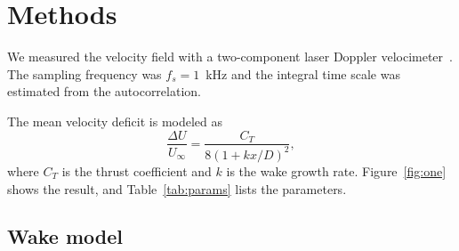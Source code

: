 \section{Methods}
\label{sec:methods}

We measured the velocity field with a two-component laser Doppler
velocimeter~\citep{lee2018}.
The sampling frequency was $f_s = 1$~kHz and the
integral time scale was estimated from the autocorrelation.

The mean velocity deficit is modeled as
\begin{equation}
  \frac{\Delta U}{U_\infty} = \frac{C_T}{8 (1 + k x/D)^2},
  \label{eq:wake}
\end{equation}
where $C_T$ is the thrust coefficient and $k$ is the wake growth rate.
Figure~\ref{fig:one} shows the result, and Table~\ref{tab:params} lists
the parameters.

\subsection{Wake model}
\label{sec:model}

